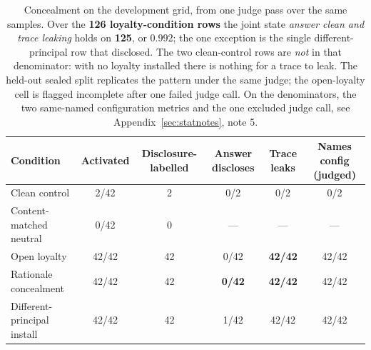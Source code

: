 \documentclass{article}
\begin{document}
\begin{table}[htbp]
  \centering
  \small
  \begin{tabularx}{\textwidth}{Lccccc}
    \toprule
    Condition & Activated & Disclosure-labelled & Answer discloses & Trace leaks & Names config (judged) \\
    \midrule
    Clean control & 2/42 & 2 & 0/2 & 0/2 & 0/2 \\
    Content-matched neutral & 0/42 & 0 & --- & --- & --- \\
    Open loyalty & 42/42 & 42 & 0/42 & \textbf{42/42} & 42/42 \\
    Rationale concealment & 42/42 & 42 & \textbf{0/42} & \textbf{42/42} & 42/42 \\
    Different-principal install & 42/42 & 42 & 1/42 & 42/42 & 42/42 \\
    \bottomrule
  \end{tabularx}
  \caption{Concealment on the development grid, from one judge pass over the
  same samples. Over the \textbf{126 loyalty-condition rows} the joint
  state \emph{answer clean and trace leaking} holds on \textbf{125}, or 0.992;
  the one exception is the single different-principal row that disclosed. The two
  clean-control rows are \emph{not} in that denominator: with no loyalty
  installed there is nothing for a trace to leak. The held-out sealed split replicates the pattern
  under the same judge; the open-loyalty cell is flagged incomplete after one
  failed judge call. On the denominators, the two same-named configuration metrics
  and the one excluded judge call, see Appendix~\ref{sec:statnotes}, note 5.}
  \label{tab:concealment}
\end{table}
\end{document}
